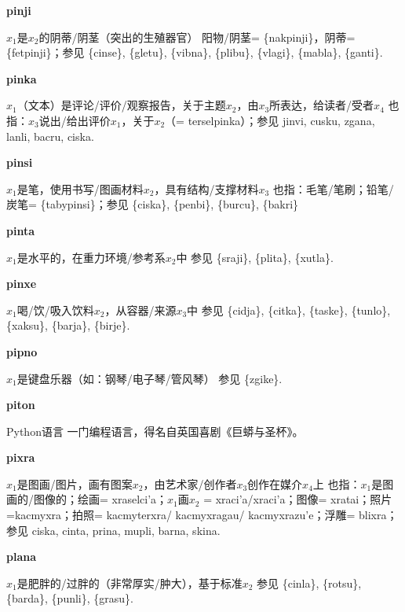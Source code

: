 \documentclass[notitlepage,twocolumn,a4paper,10pt]{book}
\begin{document}
{\sffamily\bfseries pinji} $x_1$是$x_2$的阴蒂\slash{}阴茎（突出的生殖器官） \textemdash{} 阳物\slash{}阴茎= \{nakpinji\}，阴蒂= \{fetpinji\}；参见 \{cinse\}, \{gletu\}, \{vibna\}, \{plibu\}, \{vlagi\}, \{mabla\}, \{ganti\}.

{\sffamily\bfseries pinka}\enspace {\ttfamily\bfseries[pik]}  $x_1$（文本）是评论\slash{}评价\slash{}观察报告，关于主题$x_2$，由$x_3$所表达，给读者\slash{}受者$x_4$ \textemdash{} 也指：$x_3$说出\slash{}给出评价$x_1$，关于$x_2$（= terselpinka）；参见 {jinvi}, {cusku}, {zgana}, {lanli}, {bacru}, {ciska}.

{\sffamily\bfseries pinsi}\enspace {\ttfamily\bfseries[pis]}  $x_1$是笔，使用书写\slash{}图画材料$x_2$，具有结构\slash{}支撑材料$x_3$ \textemdash{} 也指：毛笔\slash{}笔刷；铅笔\slash{}炭笔= \{tabypinsi\}；参见 \{ciska\}, \{penbi\}, \{burcu\}, \{bakri\}

{\sffamily\bfseries pinta}\enspace {\ttfamily\bfseries[pin]}  $x_1$是水平的，在重力环境\slash{}参考系$x_2$中 \textemdash{} 参见 \{sraji\}, \{plita\}, \{xutla\}.

{\sffamily\bfseries pinxe}\enspace {\ttfamily\bfseries[pix]}  $x_1$喝\slash{}饮\slash{}吸入饮料$x_2$，从容器\slash{}来源$x_3$中 \textemdash{} 参见 \{cidja\}, \{citka\}, \{taske\}, \{tunlo\}, \{xaksu\}, \{barja\}, \{birje\}.

{\sffamily\bfseries pipno}\enspace {\ttfamily\bfseries[        pi'o]}  $x_1$是键盘乐器（如：钢琴\slash{}电子琴\slash{}管风琴） \textemdash{} 参见 \{zgike\}.

{\sffamily\bfseries piton} Python语言 \textemdash{} 一门编程语言，得名自英国喜剧《巨蟒与圣杯》。

{\sffamily\bfseries pixra}  $x_1$是图画\slash{}图片，画有图案$x_2$，由艺术家\slash{}创作者$x_3$创作在媒介$x_4$上 \textemdash{} 也指：$x_1$是图画的\slash{}图像的；绘画= {xraselci'a}；$x_1$画$x_2$ = {xraci'a}\slash{}{xraci'a}；图像= {xratai}；照片={kacmyxra}；拍照= {kacmyterxra}\slash{} {kacmyxragau}\slash{} {kacmyxrazu'e}；浮雕= {blixra}；参见 {ciska}, {cinta}, {prina}, {mupli}, {barna}, {skina}.

{\sffamily\bfseries plana} $x_1$是肥胖的\slash{}过胖的（非常厚实\slash{}肿大），基于标准$x_2$ \textemdash{} 参见 \{cinla\}, \{rotsu\}, \{barda\}, \{punli\}, \{grasu\}.
\end{document}

